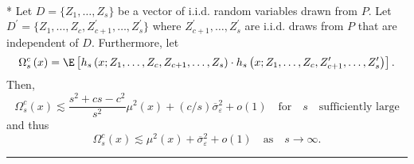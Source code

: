 \newpage
\begin{lem}\label{lem:omega_sc}\mbox{}\\*
	Let $D = \{Z_1, \dotsc, Z_{s}\}$ be a vector of i.i.d. random variables drawn from $P$.
	Let $D^{\prime} = \{Z_1, \dotsc, Z_{c}, Z_{c+1}^{\prime}, \dotsc,  Z_{s}^{\prime}\}$ where $Z_{c+1}^{\prime}, \dotsc,  Z_{s}^{\prime}$ are i.i.d. draws from $P$ that are independent of $D$.
	Furthermore, let
	\begin{equation}
		\Omega_{s}^{c}\left(x\right)
		= \E\left[h_{s}\left(x; Z_1, \ldots, Z_{c}, Z_{c+1}, \ldots, Z_{s}\right) \cdot
			h_{s}\left(x; Z_1, \ldots,Z_{c}, Z_{c+1}^{\prime}, \ldots, Z_{s}^{\prime}\right)\right].
	\end{equation}
	Then,
	\begin{equation}
		\Omega_{s}^{c}\left(x\right)
		\lesssim \frac{s^2 + cs  - c^2}{s^2} \mu^2(x) + (c/s) \overline{\sigma}_{\varepsilon}^2 + o(1)
		\quad \text{for} \quad s \quad \text{sufficiently large}
	\end{equation}
	and thus
	\begin{equation}
		\Omega_{s}^{c}\left(x\right)
		\lesssim \mu^2(x) + \overline{\sigma}_{\varepsilon}^2 + o(1)
		\quad \text{as} \quad s \rightarrow \infty.
	\end{equation}
\end{lem}
\hrule
